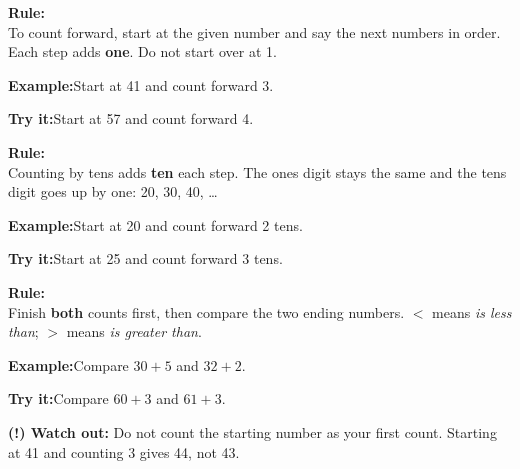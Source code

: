 \documentclass[12pt]{article}
\begin{document}

\begin{formulabox}\textbf{Rule:}\\[4pt]
To count forward, start at the given number and say the next numbers in order.
Each step adds \textbf{one}. Do not start over at 1.
\end{formulabox}
\begin{examplebox}\textbf{Example:}\quad Start at 41 and count forward 3.
\end{examplebox}
\begin{tryitbox}\textbf{Try it:}\quad Start at 57 and count forward 4.\\[2pt]
\end{tryitbox}

\begin{formulabox}\textbf{Rule:}\\[4pt]
Counting by tens adds \textbf{ten} each step. The ones digit stays the same and
the tens digit goes up by one: 20, 30, 40, \ldots
\end{formulabox}
\begin{examplebox}\textbf{Example:}\quad Start at 20 and count forward 2 tens.
\end{examplebox}
\begin{tryitbox}\textbf{Try it:}\quad Start at 25 and count forward 3 tens.\\[2pt]
\end{tryitbox}

\begin{formulabox}\textbf{Rule:}\\[4pt]
Finish \textbf{both} counts first, then compare the two ending numbers.
$<$ means \emph{is less than}; $>$ means \emph{is greater than}.
\end{formulabox}
\begin{examplebox}\textbf{Example:}\quad Compare $30+5$ and $32+2$.
\end{examplebox}
\begin{tryitbox}\textbf{Try it:}\quad Compare $60+3$ and $61+3$.\\[2pt]
\end{tryitbox}

\begin{watchoutbox}\textbf{(!) Watch out:} Do not count the starting number as
your first count. Starting at 41 and counting 3 gives 44, not 43.
\end{watchoutbox}
\end{document}
